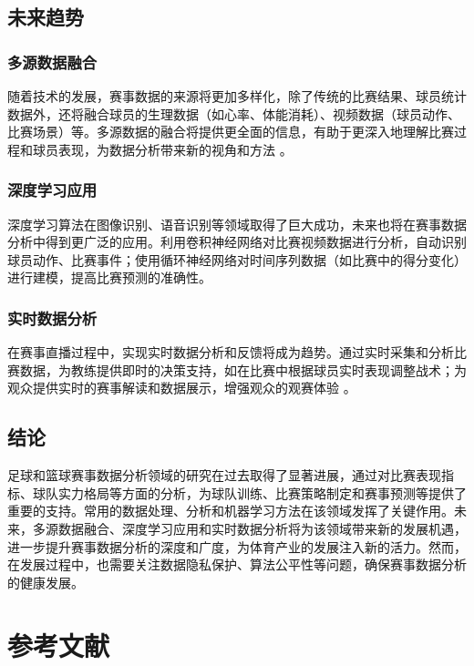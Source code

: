 \documentclass[UTF8]{ctexart}
\begin{document}
\subsection{未来趋势}\label{ux4e94ux672aux6765ux8d8bux52bf}

\subsubsection{多源数据融合}\label{ux4e00uxff09ux591aux6e90ux6570ux636eux878dux5408}

随着技术的发展，赛事数据的来源将更加多样化，除了传统的比赛结果、球员统计数据外，还将融合球员的生理数据（如心率、体能消耗）、视频数据（球员动作、比赛场景）等。多源数据的融合将提供更全面的信息，有助于更深入地理解比赛过程和球员表现，为数据分析带来新的视角和方法
。

\subsubsection{深度学习应用}\label{ux4e8cuxff09ux6df1ux5ea6ux5b66ux4e60ux5e94ux7528}

深度学习算法在图像识别、语音识别等领域取得了巨大成功，未来也将在赛事数据分析中得到更广泛的应用。利用卷积神经网络对比赛视频数据进行分析，自动识别球员动作、比赛事件；使用循环神经网络对时间序列数据（如比赛中的得分变化）进行建模，提高比赛预测的准确性。

\subsubsection{实时数据分析}\label{ux4e09uxff09ux5b9eux65f6ux6570ux636eux5206ux6790}

在赛事直播过程中，实现实时数据分析和反馈将成为趋势。通过实时采集和分析比赛数据，为教练提供即时的决策支持，如在比赛中根据球员实时表现调整战术；为观众提供实时的赛事解读和数据展示，增强观众的观赛体验
。

\subsection{结论}\label{ux516dux7ed3ux8bba}

足球和篮球赛事数据分析领域的研究在过去取得了显著进展，通过对比赛表现指标、球队实力格局等方面的分析，为球队训练、比赛策略制定和赛事预测等提供了重要的支持。常用的数据处理、分析和机器学习方法在该领域发挥了关键作用。未来，多源数据融合、深度学习应用和实时数据分析将为该领域带来新的发展机遇，进一步提升赛事数据分析的深度和广度，为体育产业的发展注入新的活力。然而，在发展过程中，也需要关注数据隐私保护、算法公平性等问题，确保赛事数据分析的健康发展。

\section*{参考文献}

\printbibliography %
\end{document}
